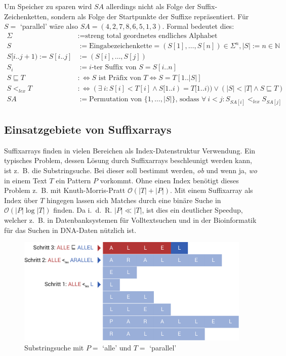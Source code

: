 \documentclass[twoside,11pt]{article}
\theoremstyle{break}
\begin{document}
Um Speicher zu sparen wird $SA$ allerdings nicht als Folge der Suffix-Zeichenketten, sondern als Folge der Startpunkte der Suffixe repräsentiert. Für $S =$ `parallel' wäre also $SA = (4, 2, 7, 8, 6, 5, 1, 3)$. Formal bedeutet dies:
\begin{align*}
	\Sigma &:= \text{streng total geordnetes endliches Alphabet} \\
	S &:= \text{Eingabezeichenkette} = (S[1], \dots, S[n]) \in \Sigma^n, |S| := n \in \mathbb{N} \\
	S[i .. j + 1) := S[i .. j] &:= (S[i], \dots, S[j]) \\
	S_i &:= \text{$i$-ter Suffix von $S$} = S[i .. n] \\
	S \sqsubseteq T &:\Leftrightarrow \text{$S$ ist Präfix von $T$} \Leftrightarrow S = T[1 .. |S|] \\
	S <_{lex} T &:\Leftrightarrow (\exists\ i: S[i] < T[i] \land S[1 .. i) = T[1 .. i)) \lor (|S| < |T| \land S \sqsubseteq T) \\
	SA &:= \text{Permutation von } \{1, \dots, |S|\} \text{, sodass } \forall\ i < j: S_{SA[i]} <_{lex} S_{SA[j]}
\end{align*}

\subsection{Einsatzgebiete von Suffixarrays}

Suffixarrays finden in vielen Bereichen als Index-Datenstruktur Verwendung. Ein typisches Problem, dessen Lösung durch Suffixarrays beschleunigt werden kann, ist z.~B. die Substringsuche. Bei dieser soll bestimmt werden, \textit{ob} und wenn ja, \textit{wo} in einem Text $T$ ein Pattern $P$ vorkommt. Ohne einen Index benötigt dieses Problem z.~B. mit Knuth-Morris-Pratt $\mathcal{O}(|T| + |P|)$. Mit einem Suffixarray als Index über $T$ hingegen lassen sich Matches durch eine binäre Suche in $\mathcal{O}(|P| \log |T|)$ finden. Da i.~d.~R. $|P| \ll |T|$, ist dies ein deutlicher Speedup, welcher z.~B. in Datenbanksystemen für Volltextsuchen und in der Bioinformatik für das Suchen in DNA-Daten nützlich ist.

\begin{figure}[h]
	\centering
	\includegraphics[width=0.7\linewidth,bb=0 0 1010 462]{./assets/substringSearch.pdf}
	\caption{Substringsuche mit $P =$ `alle' und $T =$ `parallel'}
\label{fig:substringSearch}
\end{figure}
\end{document}
